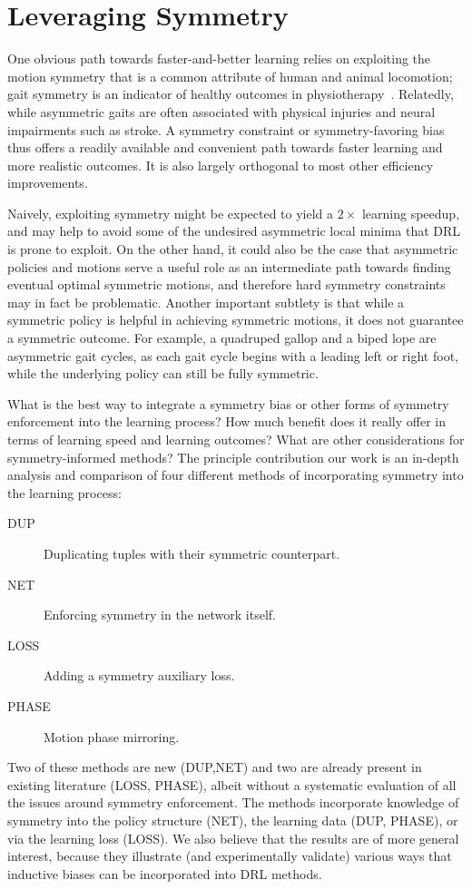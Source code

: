 \chapter{Leveraging Symmetry}
\label{ch:symmetry}

One obvious path towards faster-and-better learning relies on exploiting the motion symmetry
that is a common attribute of human and animal locomotion;
gait symmetry is an indicator of healthy outcomes in 
physiotherapy~\citep{robinson1987use, riskowski}.
Relatedly, while asymmetric gaits are often associated 
with physical injuries and neural impairments such as stroke.  
A symmetry constraint or symmetry-favoring bias thus offers a readily available and convenient 
path towards faster learning and more realistic outcomes. 
It is also largely orthogonal to most other efficiency improvements.

Naively, exploiting symmetry might be expected to yield a $2\times$ learning speedup, and may help to avoid
some of the undesired asymmetric local minima that \ac{DRL} is prone to exploit.  On the other hand,
it could also be the case that asymmetric policies and motions serve a useful role as an intermediate path 
towards finding eventual optimal symmetric motions, and therefore
hard symmetry constraints may in fact be problematic.
Another important subtlety is that while a symmetric policy is helpful in achieving symmetric motions,
it does not guarantee a symmetric outcome.
For example, a quadruped gallop and a biped lope are asymmetric gait cycles, 
as each gait cycle begins with a leading left or right foot, while the underlying 
policy can still be fully symmetric.

What is the best way to integrate a symmetry bias or other forms of symmetry enforcement into the learning process?
How much benefit does it really offer in terms of learning speed and learning outcomes?
What are other considerations for symmetry-informed methods?
The principle contribution our work is an in-depth analysis and comparison of four different methods
of incorporating symmetry into the learning process:
\begin{description}
\item [DUP]  Duplicating tuples with their symmetric counterpart.
\item [NET]  Enforcing symmetry in the network itself.
\item [LOSS] Adding a symmetry auxiliary loss.
\item [PHASE] Motion phase mirroring.
\end{description}
Two of these methods are new (DUP,NET) and two are already present in existing literature (LOSS, PHASE), 
albeit without a systematic evaluation of all the issues around symmetry enforcement. 
The methods incorporate knowledge of symmetry into the policy structure (NET), 
the learning data (DUP, PHASE), or via the learning loss (LOSS). 
We also believe that the results are of more general interest, because they 
illustrate (and experimentally validate) various ways that inductive biases 
can be incorporated into \ac{DRL} methods.

